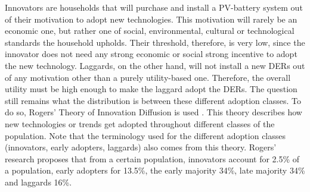 Innovators are households that will purchase and install a PV-battery system out of their motivation to adopt new technologies. This motivation will rarely be an economic one, but rather one of social, environmental, cultural or technological standards the household upholds. Their threshold, therefore, is very low, since the innovator does not need any strong economic or social strong incentive to adopt the new technology. Laggards, on the other hand, will not install a new DERs out of any motivation other than a purely utility-based one. Therefore, the overall utility must be high enough to make the laggard adopt the DERs.
\newline 
\newline
\noindent
The question still remains what the distribution is between these different adoption classes. To do so, Rogers' Theory of Innovation Diffusion is used \cite{Rogers}. This theory describes how new technologies or trends get adopted throughout different classes of the population. Note that the terminology used for the different adoption classes (innovators, early adopters, laggards) also comes from this theory. Rogers' research proposes that from a certain population, innovators account for 2.5\% of a population, early adopters for 13.5\%, the early majority 34\%, late majority 34\% and laggards 16\%. %
